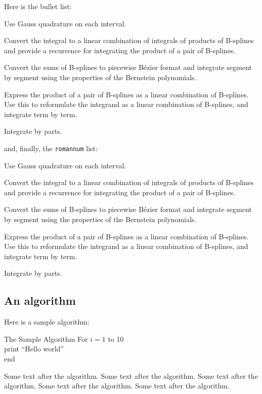 \documentclass{SIAMGHbook2016}
\begin{document}
Here is the bullet list:
\begin{bulletlist}
\item Use Gauss quadrature on each interval.
\item Convert the integral to a linear combination of
      integrals of products of B-splines and provide a recurrence for
      integrating the product of a pair of B-splines.
\item Convert the sums of B-splines to piecewise
      B\'{e}zier format and integrate segment
      by segment using the properties of the Bernstein polynomials.
\item Express the product of a pair of B-splines as a linear combination
      of B-splines.
      Use this to reformulate the integrand as a linear combination
      of B-splines, and integrate term by term.
\item Integrate by parts.
\end{bulletlist}
and, finally, the \verb+romannum+ list:
\begin{romannum}
\item Use Gauss quadrature on each interval.
\item Convert the integral to a linear combination of
      integrals of products of B-splines and provide a recurrence for
      integrating the product of a pair of B-splines.
\item Convert the sums of B-splines to piecewise
      B\'{e}zier format and integrate segment
      by segment using the properties of the Bernstein polynomials.
\item Express the product of a pair of B-splines as a linear combination
      of B-splines.
      Use this to reformulate the integrand as a linear combination
      of B-splines, and integrate term by term.
\item Integrate by parts.
\end{romannum}

\subsection{An algorithm}
Here is a sample algorithm:
\begin{algorithm}{The Sample Algorithm}
For $i=1$ to 10\\
print ``Hello world''\\
end
\end{algorithm}
Some text after the algorithm. Some text after the algorithm. Some text after the algorithm.
Some text after the algorithm. Some text after the algorithm.
\end{document}
